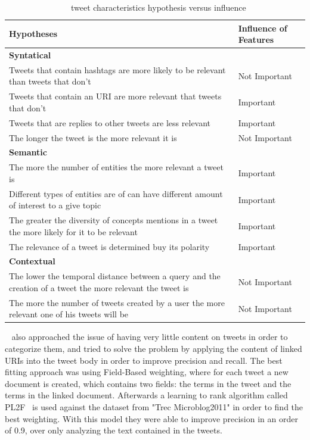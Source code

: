 \begin{table}[tb]
  \caption{~\citet{Tao2012} tweet characteristics hypothesis versus influence}
  \label{tab:tao_table}
  \begin{tabularx}{\textwidth}{|X|l|}
  \hline
  \textbf{Hypotheses} & \textbf{Influence of Features} \\
  \hline
  \hline

  {\bf Syntatical} &  \\
  \hline
  Tweets that contain hashtags are more likely to be relevant than tweets that don't & Not Important \\
  \hline
  Tweets that contain an URI are more relevant that tweets that don't  &Important \\
  \hline
  Tweets that are replies to other tweets are less relevant & Important \\
  \hline
  The longer the tweet is the more relevant it is & Not Important\\
  \hline
  \hline

  {\bf Semantic}  &  \\
  \hline
  
  The more the number of entities the more relevant a tweet is  & Important \\
  \hline
  Different types of entities are of can have different amount of interest to a give topic  & Important \\
  \hline
  The greater the diversity of concepts mentions in a tweet the more likely for it to be relevant & Important \\
  \hline
  The relevance of a tweet is determined buy its polarity & Important \\
  \hline
  \hline

  {\bf Contextual} &  \\
  \hline
  The lower the temporal distance between a query and the creation of a tweet the more relevant the tweet is  & Not Important \\
  \hline
  The more the number of tweets created by a user the more relevant one of his tweets will be & Not Important \\
  \hline
  \end{tabularx}
\end{table}

~\citet{McCreadie2013} also approached the issue of having very little content on tweets in order to categorize them, and tried to solve the problem by applying the content of linked URIs into the tweet body in order to improve precision and recall. The best fitting approach was using Field-Based weighting, where for each tweet a new document is created, which contains two fields: the terms in the tweet and the terms in the linked document. 
Afterwards a learning to rank algorithm called PL2F~\cite{macdonald2008} is used against the dataset from "Trec Microblog2011" in order to find the best weighting. 
With this model they were able to improve precision in an order of 0.9, over only analyzing the text contained in the tweets. 

